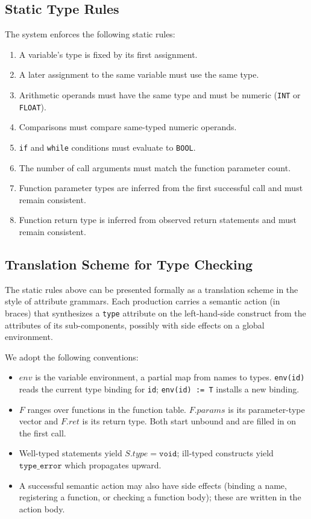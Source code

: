 \documentclass[12pt,a4paper]{article}
\begin{document}
\subsection{Static Type Rules}
The system enforces the following static rules:

\begin{enumerate}[leftmargin=1.2cm]
    \item A variable's type is fixed by its first assignment.
    \item A later assignment to the same variable must use the same type.
    \item Arithmetic operands must have the same type and must be numeric (\texttt{INT} or \texttt{FLOAT}).
    \item Comparisons must compare same-typed numeric operands.
    \item \texttt{if} and \texttt{while} conditions must evaluate to \texttt{BOOL}.
    \item The number of call arguments must match the function parameter count.
    \item Function parameter types are inferred from the first successful call and must remain consistent.
    \item Function return type is inferred from observed return statements and must remain consistent.
\end{enumerate}

\subsection{Translation Scheme for Type Checking}
The static rules above can be presented formally as a translation scheme in the style of attribute grammars. Each production carries a semantic action (in braces) that synthesizes a \texttt{type} attribute on the left-hand-side construct from the attributes of its sub-components, possibly with side effects on a global environment.

We adopt the following conventions:
\begin{itemize}[leftmargin=1.0cm]
    \item $\mathit{env}$ is the variable environment, a partial map from names to types. \texttt{env(id)} reads the current type binding for \texttt{id}; \texttt{env(id) := T} installs a new binding.
    \item $F$ ranges over functions in the function table. $F.\mathit{params}$ is its parameter-type vector and $F.\mathit{ret}$ is its return type. Both start unbound and are filled in on the first call.
    \item Well-typed statements yield $S.\mathit{type} = \mathtt{void}$; ill-typed constructs yield $\mathtt{type\_error}$ which propagates upward.
    \item A successful semantic action may also have side effects (binding a name, registering a function, or checking a function body); these are written in the action body.
\end{itemize}
\end{document}
